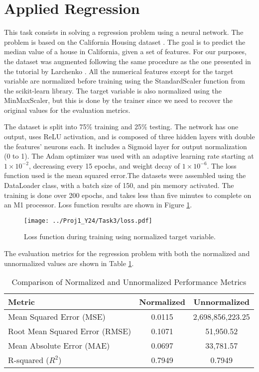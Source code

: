\documentclass[unicode,11pt,a4paper,oneside,numbers=endperiod,openany]{scrartcl}
\begin{document}
\section{Applied Regression}\label{sec:task3}
This task consists in solving a regression problem using a neural network. The
problem is based on the California Housing dataset
\cite{wang_california_housing_1990}.
The goal is to predict the median value of a house in California, given
a set of features. 
For our purposes, the dataset was augmented following the same procedure as the
one presented in the tutorial
by Larchenko \cite{Larchenko2019}. 
All the numerical features except for the target
variable are normalized before training using the StandardScaler function from
the scikit-learn library. The target variable is also normalized using the
MinMaxScaler, but this is done by the trainer since we need to recover the
original values for the evaluation metrics.

The dataset is split into 75\% training and 25\% testing. The network has one
output, uses ReLU activation, and is composed of three hidden layers with double
the features' neurons each. It includes a Sigmoid layer for output normalization
(0 to 1). The Adam optimizer was used with an adaptive learning rate starting
at $1\times10^{-2}$, decreasing every 15 epochs, and weight decay of
$1\times10^{-6}$. The loss function used is the mean squared error.The datasets
were assembled using the DataLoader class, with a batch
size of 150, and pin memory activated. The training is done over 200 epochs, and
takes less than five minutes to complete on an M1 processor. Loss function
results are shown in Figure \ref{fig:task3_loss}.
\begin{figure}[h]
    \centering
    \texttt{[image: ../Proj1\_Y24/Task3/loss.pdf]}
    \caption{Loss function during training using normalized target variable.}
    \label{fig:task3_loss}
\end{figure}
The evaluation metrics for the regression problem with both the normalized and
unnormalized values are shown in Table \ref{tab:evaluation_metrics}. 
\begin{table}[htbp]
    \centering
    \begin{tabular}{lcc}
        \hline
        \textbf{Metric} & \textbf{Normalized} & \textbf{Unnormalized} \\
        \hline
        Mean Squared Error (MSE) & 0.0115 & 2,698,856,223.25 \\
        Root Mean Squared Error (RMSE) & 0.1071 & 51,950.52 \\
        Mean Absolute Error (MAE) & 0.0697 & 33,781.57 \\
        R-squared ($R^2$) & 0.7949 & 0.7949 \\
        \hline
    \end{tabular}
    \caption{Comparison of Normalized and Unnormalized Performance Metrics}
    \label{tab:evaluation_metrics}
\end{table}
\end{document}
